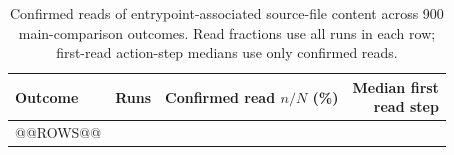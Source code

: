 \begin{table}[htbp]
  \centering
    \caption{Confirmed reads of entrypoint-associated source-file content across
    900 main-comparison outcomes. Read fractions use all runs in each row;
    first-read action-step medians use only confirmed reads.}
    \label{tab:source-exposure}

    \centering
    \footnotesize

    \begin{tabular}{@{}lrrr@{}}
      \toprule
      Outcome
        & Runs
        & \shortstack{Confirmed read\\$n/N$ (\%)}
        & \shortstack{Median first\\read step} \\
      \midrule
@@ROWS@@

      \bottomrule
    \end{tabular}

\end{table}
